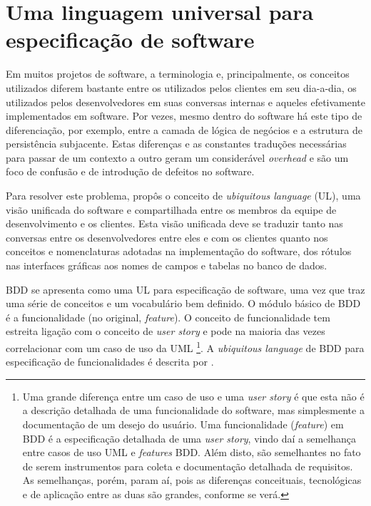 \documentclass[a4paper,abntfigtabnum,noindentfirst]{abnt}
\begin{document}
\section{Uma linguagem universal para especificação de software}

Em muitos projetos de software, a terminologia e, principalmente, os conceitos utilizados diferem bastante entre os utilizados pelos clientes em seu dia-a-dia, os utilizados pelos desenvolvedores em suas conversas internas e aqueles efetivamente implementados em software. Por vezes, mesmo dentro do software há este tipo de diferenciação, por exemplo, entre a camada de lógica de negócios e a estrutura de persistência subjacente. Estas diferenças e as constantes traduções necessárias para passar de um contexto a outro geram um considerável \textit{overhead} e são um foco de confusão e de introdução de defeitos no software.

Para resolver este problema,  propôs o conceito de \textit{ubiquitous language} (UL), uma visão unificada do software e compartilhada entre os membros da equipe de desenvolvimento e os clientes. Esta visão unificada deve se traduzir tanto nas conversas entre os desenvolvedores entre eles e com os clientes quanto nos conceitos e nomenclaturas adotadas na implementação do software, dos rótulos nas interfaces gráficas aos nomes de campos e tabelas no banco de dados.

BDD se apresenta como uma UL para especificação de software, uma vez que traz uma série de conceitos e um vocabulário bem definido. O módulo básico de BDD é a funcionalidade (no original, \textit{feature}). O conceito de funcionalidade tem estreita ligação com o conceito de \textit{user story} \cite{XP2ndEd} \cite{UserStoriesApplied} e pode na maioria das vezes correlacionar com um caso de uso da UML \cite{UML}\footnote{Uma grande diferença entre um caso de uso e uma \textit{user story} é que esta não é a descrição detalhada de uma funcionalidade do software, mas simplesmente a documentação de um desejo do usuário. Uma funcionalidade (\textit{feature}) em BDD é a especificação detalhada de uma \textit{user story}, vindo daí a semelhança entre casos de uso UML e \textit{features} BDD.  Além disto, são semelhantes no fato de serem instrumentos para coleta e documentação detalhada de requisitos. As semelhanças, porém, param aí, pois as diferenças conceituais, tecnológicas e de aplicação entre as duas são grandes, conforme se verá.}. A \textit{ubiquitous language} de BDD para especificação de funcionalidades é descrita por .
\end{document}
